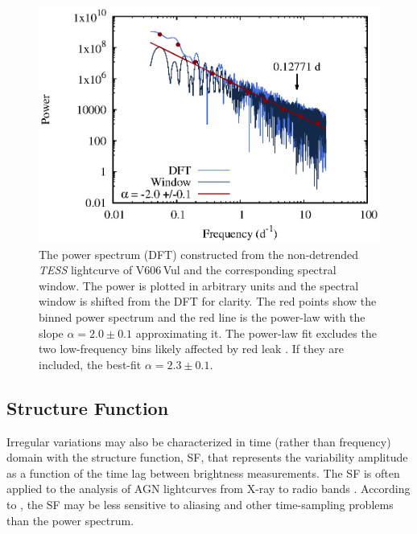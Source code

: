 \documentclass[twocolumn]{aastex631}
\newcommand{\nova}{V606\,Vul}
\begin{document}
\begin{figure}
\centering
        \includegraphics[width=1.0\linewidth,clip=true,trim=0.0cm 0cm 0cm 0cm,angle=0]{powerspectrum_TESS_flux.eps}
\caption{The power spectrum (DFT) constructed from the non-detrended {\em TESS} lightcurve of
\nova{} and the corresponding spectral window. The power is plotted in
arbitrary units and the spectral window is shifted from the DFT for clarity. 
The red points show the binned power spectrum and the red line is the power-law with the slope
$\alpha = 2.0 \pm 0.1$ approximating it. The power-law fit excludes the two
low-frequency bins likely affected by red leak
\citep[e.g.,][]{1993MNRAS.261..612P,2002MNRAS.332..231U}. 
If they are included, the best-fit $\alpha = 2.3 \pm 0.1$.}
    \label{fig:powerspec}
\end{figure}



\subsection{Structure Function}
\label{sec:sf}

Irregular variations may also be characterized in time (rather than frequency) domain with the structure function, SF,  
that represents the variability amplitude as a function of the time lag between brightness measurements. 
The SF is often applied to the analysis of AGN lightcurves from X-ray to radio bands 
\citep[e.g.,][]{2001ApJ...555..775C,2010ApJ...714.1194S,2017ApJ...834..111C}. 
According to \cite{2010ApJ...721.1014M}, the SF may be less sensitive to aliasing and other time-sampling problems than
the power spectrum. 
\end{document}
